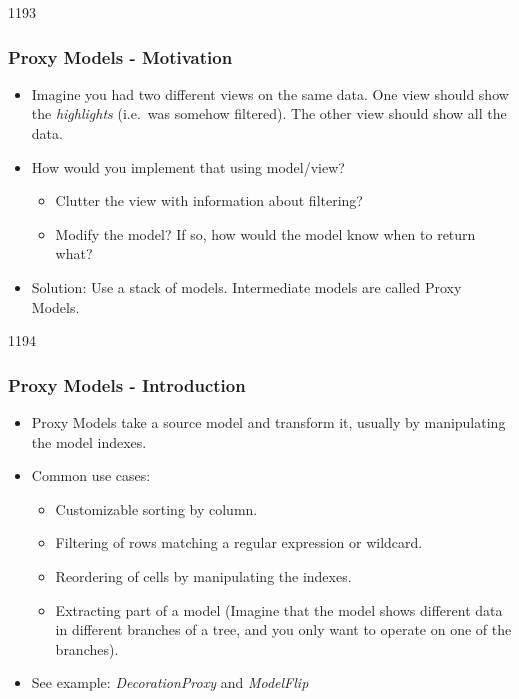 \begin{slide}{1193}\frametitle{Proxy Models - Motivation}\label{proxymodels}
  \begin{itemize}
  \item Imagine you had two different views on the same data. One view
    should show the \emph{highlights} (i.e.\ was somehow filtered). The other
    view should show all the data.
  \item How would you implement that using model/view?
    \begin{itemize}
    \item Clutter the view with information about filtering?
    \item Modify the model? If so, how would the model know when to return what?
    \end{itemize}
  \item Solution: Use a stack of models. Intermediate models are called Proxy
    Models. 
  \end{itemize}
\end{slide}

\begin{slide}[fragile]{1194}\frametitle{Proxy Models - Introduction}
  \begin{itemize}
  \item Proxy Models take a source model and transform it, usually by manipulating
    the model indexes.
  \item Common use cases:
    \begin{itemize}
    \item Customizable sorting by column.
    \item Filtering of rows matching a regular expression or wildcard.
    \item Reordering of cells by manipulating the indexes.
    \item Extracting part of a model (Imagine that the model shows different
      data in different branches of a tree, and you only want to operate on
      one of the branches).
    \end{itemize}
  \item See example: \emph{DecorationProxy} and \emph{ModelFlip}
  \end{itemize}
\end{slide}


